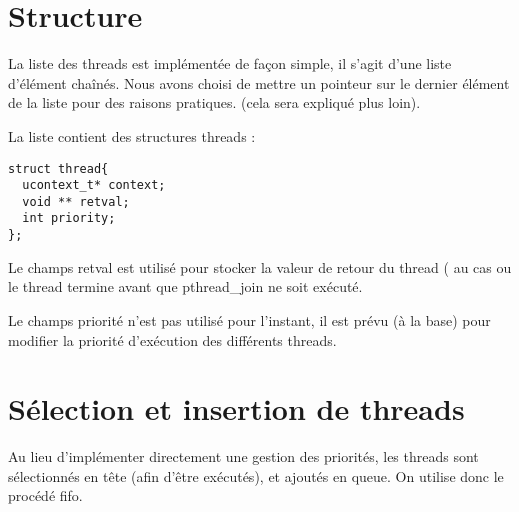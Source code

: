 \section{Structure}
La liste des threads est implémentée de façon simple, il s'agit d'une liste d'élément chaînés. Nous avons choisi de mettre un pointeur sur le dernier élément de la liste pour des raisons pratiques. (cela sera expliqué plus loin).

La liste contient des structures threads :
\begin{verbatim}
struct thread{
  ucontext_t* context;
  void ** retval;
  int priority;
};
\end{verbatim}
Le champs retval est utilisé pour stocker la valeur de retour du thread ( au cas ou le thread termine avant que pthread\_join ne soit exécuté.

Le champs priorité n'est pas utilisé pour l'instant, il est prévu (à la base) pour modifier la priorité d'exécution des différents threads.

\section{Sélection et insertion de threads}
Au lieu d'implémenter directement une gestion des priorités, les threads sont sélectionnés en tête (afin d'être exécutés), et ajoutés en queue. On utilise donc le procédé fifo.
